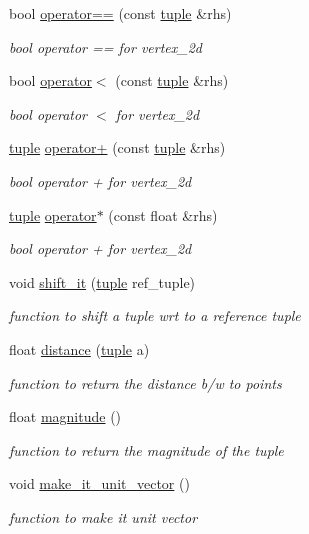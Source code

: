 \begin{DoxyCompactItemize}
bool \hyperlink{classtuple_ab57f6f6b41927094633d0d27206181a6}{operator==} (const \hyperlink{classtuple}{tuple} \&rhs)
\begin{DoxyCompactList}\small\item\em bool operator == for vertex\+\_\+2d \end{DoxyCompactList}\item 
bool \hyperlink{classtuple_a121aea0bdaa821cbd870e0de3d161fa3}{operator$<$} (const \hyperlink{classtuple}{tuple} \&rhs)
\begin{DoxyCompactList}\small\item\em bool operator $<$ for vertex\+\_\+2d \end{DoxyCompactList}\item 
\hyperlink{classtuple}{tuple} \hyperlink{classtuple_a828ed2b69e93d38f03d986ea39e10ae6}{operator+} (const \hyperlink{classtuple}{tuple} \&rhs)
\begin{DoxyCompactList}\small\item\em bool operator + for vertex\+\_\+2d \end{DoxyCompactList}\item 
\hyperlink{classtuple}{tuple} \hyperlink{classtuple_aa475aea27ce5ef5fe97f75243ce1bfd3}{operator$\ast$} (const float \&rhs)
\begin{DoxyCompactList}\small\item\em bool operator + for vertex\+\_\+2d \end{DoxyCompactList}\item 
void \hyperlink{classtuple_a83e59acf101fea3b456df1315b04e4b8}{shift\+\_\+it} (\hyperlink{classtuple}{tuple} ref\+\_\+tuple)
\begin{DoxyCompactList}\small\item\em function to shift a tuple wrt to a reference tuple \end{DoxyCompactList}\item 
float \hyperlink{classtuple_a841aaedd191b831b519d3eb7eeae288c}{distance} (\hyperlink{classtuple}{tuple} a)
\begin{DoxyCompactList}\small\item\em function to return the distance b/w to points \end{DoxyCompactList}\item 
float \hyperlink{classtuple_ad60cd51bb5c688f7193fe8f9e6c466b4}{magnitude} ()
\begin{DoxyCompactList}\small\item\em function to return the magnitude of the tuple \end{DoxyCompactList}\item 
void \hyperlink{classtuple_a9a0dddc69bd8da80d05ff0397dee7f68}{make\+\_\+it\+\_\+unit\+\_\+vector} ()
\begin{DoxyCompactList}\small\item\em function to make it unit vector \end{DoxyCompactList}\end{DoxyCompactItemize}

